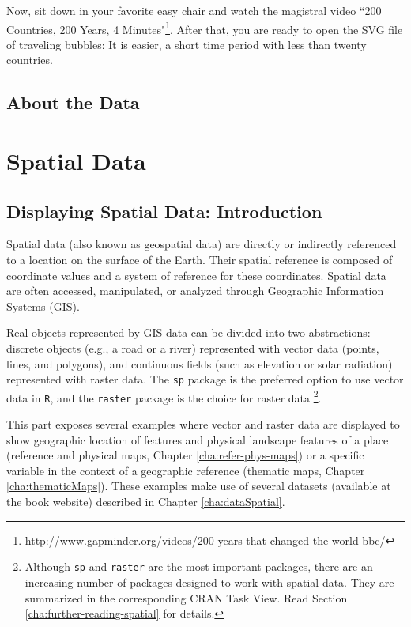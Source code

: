 \documentclass[smallroyalvopaper]{memoir}
\begin{document}
Now, sit down in your favorite easy chair and watch the magistral
video ``200 Countries, 200 Years, 4 Minutes"\footnote{\url{http://www.gapminder.org/videos/200-years-that-changed-the-world-bbc/}}. After that, you are
ready to open the SVG file of traveling bubbles: It is easier, a short
time period with less than twenty countries.

\chapter{About the Data}
\label{sec:orgheadline22}
\label{cha:dataTime}

\part{Spatial Data}
\label{sec:orgheadline37}

\chapter{Displaying Spatial Data: Introduction}
\label{sec:orgheadline33}
\label{cha:spatialIntro}

Spatial data (also known as geospatial data) are directly or indirectly referenced to a location on the surface of the Earth. Their spatial reference is composed of coordinate values and a system of reference for these coordinates. Spatial data are often accessed, manipulated, or analyzed through Geographic Information Systems (GIS).

Real objects represented by GIS data can be divided into two abstractions: discrete objects (e.g., a road or a river) represented with vector data (points, lines, and polygons), and continuous fields (such as elevation or solar radiation) represented with raster data. The \texttt{sp} package is the preferred option to use vector data in \texttt{R}, and the \texttt{raster} package is the choice for raster data \footnote{Although \texttt{sp} and \texttt{raster} are the most important packages, there are an increasing number of packages designed to work with spatial data. They are summarized in the corresponding CRAN Task View. Read Section \ref{cha:further-reading-spatial} for details.}.

This part exposes several examples where vector and raster data are displayed to show geographic location of features and physical landscape features of a place (reference and physical maps, Chapter \ref{cha:refer-phys-maps}) or a specific variable in the context of a geographic reference (thematic maps, Chapter \ref{cha:thematicMaps}). These examples make use of several datasets (available at the book website) described in Chapter \ref{cha:dataSpatial}.
\end{document}
